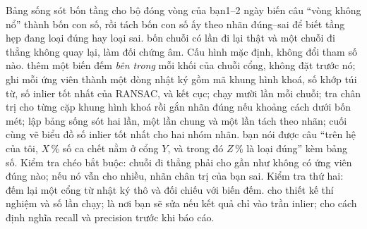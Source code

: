 \documentclass[../../deep_learning.tex]{subfiles}
\begin{document}
\begin{ungdung}
\end{ungdung}

\begin{duan}{Bảng sống sót bốn tầng cho bộ đóng vòng của bạn}{1--2 ngày}
\dmt biến câu ``vòng không nổ'' thành bốn con số, rồi tách bốn con số ấy theo nhãn đúng--sai để biết tầng hẹp đang loại đúng hay loại sai.
\ddl bốn chuỗi có lần đi lại thật và một chuỗi đi thẳng không quay lại, làm đối chứng âm. Cấu hình mặc định, không đổi tham số nào.
\dbc thêm một biến đếm \emph{bên trong} mỗi khối  của chuỗi cổng, không đặt trước nó; ghi mỗi ứng viên thành một dòng nhật ký gồm mã khung hình khoá, số khớp túi từ, số inlier tốt nhất của RANSAC, và kết cục; chạy mười lần mỗi chuỗi; tra chân trị cho từng cặp khung hình khoá rồi gắn nhãn đúng nếu khoảng cách dưới bốn mét; lập bảng sống sót hai lần, một lần chung và một lần tách theo nhãn; cuối cùng vẽ biểu đồ số inlier tốt nhất cho hai nhóm nhãn.
\dxk bạn nói được câu ``trên hệ của tôi, \(X\)\,\% số ca chết nằm ở cổng \(Y\), và trong đó \(Z\)\,\% là loại đúng'' kèm bảng số. Kiểm tra chéo bắt buộc: chuỗi đi thẳng phải cho gần như không có ứng viên đúng nào; nếu nó vẫn cho nhiều, nhãn chân trị của bạn sai. Kiểm tra thứ hai: đếm lại một cổng từ nhật ký thô và đối chiếu với biến đếm.
\dnv {} cho thiết kế thí nghiệm và số lần chạy;  là nơi bạn sẽ sửa nếu kết quả chỉ vào trần inlier;  cho cách định nghĩa recall và precision trước khi báo cáo.
\end{duan}
\end{document}
